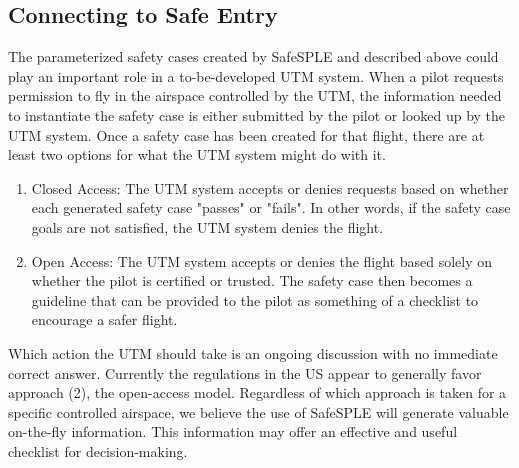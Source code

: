 \subsection{Connecting to Safe Entry}
\label{sec:safe_entry}

The parameterized safety cases created by SafeSPLE and described above could play an important role in a to-be-developed UTM system. When a pilot requests permission to fly in the airspace controlled by the UTM, the information needed to instantiate the safety case is either submitted by the pilot or looked up by the UTM system. Once a safety case has been created for that flight, there are at least two options for what the UTM system might do with it. 

\begin{enumerate}
    \item Closed Access: The UTM system accepts or denies requests based on whether each generated safety case "passes" or "fails". In other words, if the safety case goals are not satisfied, the UTM system  denies the flight. 
    \item Open Access: The UTM system accepts or denies the flight based solely on whether the pilot is certified or trusted. The safety case then becomes a guideline that can be provided to the pilot as something of a checklist to encourage a safer flight.
\end{enumerate}

Which action the UTM should take is an ongoing discussion with no immediate correct answer.
Currently the regulations in the US appear to generally favor approach (2), the open-access model. Regardless of which approach is taken for a specific controlled airspace, we believe the use of SafeSPLE will generate valuable on-the-fly information.  This information may offer an effective and useful checklist for decision-making. 
